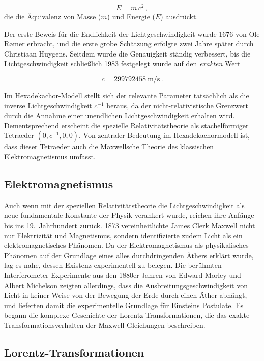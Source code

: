\documentclass{scrartcl}
\begin{document}
\begin{equation*}\label{emc2}
  E=m\,c^2\,,
\end{equation*}
%
die die Äquivalenz von Masse ($m$) und Energie ($E$) ausdrückt.

Der erste Beweis für die Endlichkeit der Lichtgeschwindigkeit wurde 1676 von Ole Rømer erbracht, und die erste grobe Schätzung erfolgte zwei Jahre später durch Christiaan Huygens. Seitdem wurde die Genauigkeit ständig verbessert, bis die Lichtgeschwindigkeit schließlich 1983 festgelegt wurde auf den \emph{exakten} Wert 

\begin{equation*}
  c=\SI{299 792 458}{\meter \per \second}\,.
\end{equation*}

Im Hexadekachor-Modell stellt sich der relevante Parameter tatsächlich als die inverse Lichtgeschwindigkeit $c^{-1}$ heraus, da der nicht-relativistische Grenzwert durch die Annahme einer unendlichen Lichtgeschwindigkeit erhalten wird. Dementsprechend erscheint die spezielle Relativitätstheorie als stachelförmiger Tetraeder $(0, c^{-1}, 0, 0)$. Von zentraler Bedeutung im Hexadekachormodell ist, dass dieser Tetraeder auch die Maxwellsche Theorie des klassischen Elektromagnetismus umfasst. 


\subsection*{Elektromagnetismus}

Auch wenn mit der speziellen Relativitätstheorie die Lichtgeschwindigkeit als neue fundamentale Konstante der Physik verankert wurde, reichen ihre Anfänge bis ins 19.\ Jahrhundert zurück. 1873 vereinheitlichte James Clerk Maxwell nicht nur Elektrizität und Magnetismus, sondern identifizierte zudem Licht als ein elektromagnetisches Phänomen. Da der Elektromagnetismus als physikalisches Phänomen auf der Grundlage eines alles durchdringenden Äthers erklärt wurde, lag es nahe, dessen Existenz experimentell zu belegen. Die berühmten Interferometer-Experimente aus den 1880er Jahren von Edward Morley und Albert Michelson zeigten allerdings, dass die Ausbreitungsgeschwindigkeit von Licht in keiner Weise von der Bewegung der Erde durch einen Äther abhängt, und lieferten damit die experimentelle Grundlage für Einsteins Postulate. Es begann die komplexe Geschichte der Lorentz-Transformationen, die das exakte Transformationsverhalten der Maxwell-Gleichungen beschreiben.


\subsection*{Lorentz-Transformationen}
\end{document}
